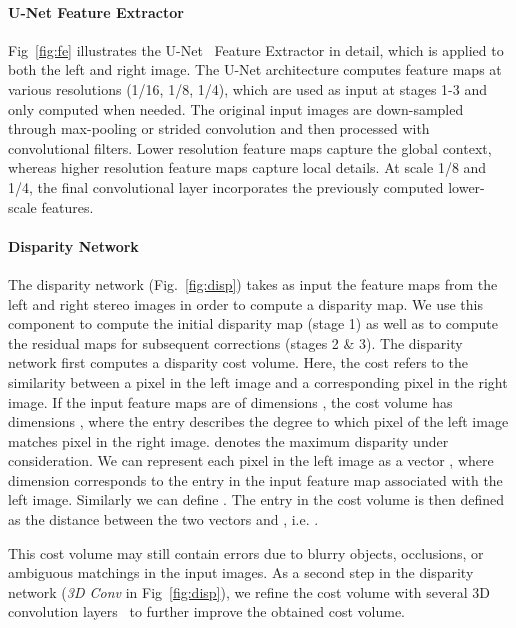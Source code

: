 \documentclass[letterpaper, 10 pt, conference]{ieeeconf}
\begin{document}
\paragraph{U-Net Feature Extractor}
 Fig~\ref{fig:fe} illustrates the U-Net~\cite{ronneberger2015u} Feature Extractor in detail, which is applied to  both the left and right image. The U-Net architecture computes feature maps at various resolutions (1/16, 1/8, 1/4), which are used as input at stages 1-3 and only computed when needed. The original input images are down-sampled through max-pooling or strided convolution and then processed with convolutional filters. Lower resolution feature maps capture the global context, whereas higher resolution feature maps capture local details. At scale 1/8 and 1/4, the final convolutional layer incorporates the previously computed lower-scale features. 




\paragraph{Disparity Network}
The disparity network (Fig.~\ref{fig:disp}) takes as input the feature maps from the left and right stereo images in order to compute a disparity map. We use this component to compute the initial disparity map (stage 1) as well as to compute the residual maps for subsequent corrections (stages 2 \& 3). The disparity network first computes a disparity cost volume. Here, the cost refers to the similarity between a pixel in the left image and a corresponding pixel in the right image.  If the input feature maps are of dimensions , the cost volume has dimensions , where the  entry describes the degree to which pixel  of the left image matches pixel  in the right image.  denotes the maximum disparity under consideration. We can represent each pixel  in the left image as a vector , where dimension  corresponds to the  entry in the  input feature map  associated with the left image. Similarly we can define . The entry  in the cost volume is then defined as the  distance between the two vectors  and , i.e. . 










This cost volume may still contain errors due to blurry objects, occlusions, or ambiguous matchings in the input images. As a second step in the disparity network (\emph{3D Conv} in Fig~\ref{fig:disp}), we refine the cost volume with several 3D convolution layers~\cite{kendall2017end} to further improve the obtained cost volume.
\end{document}
